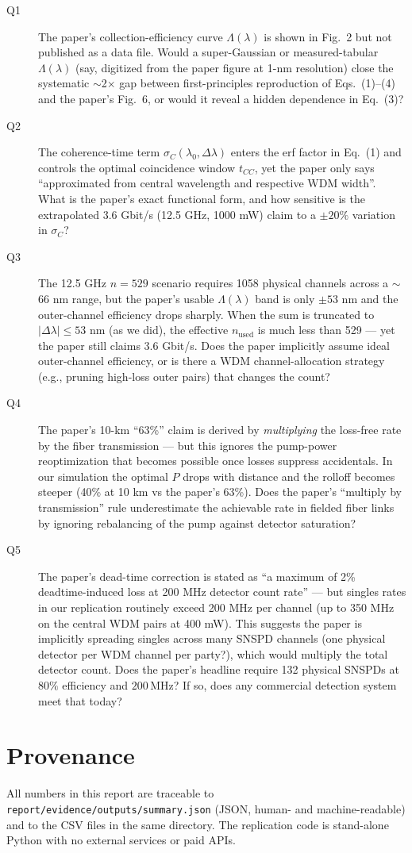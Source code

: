 \documentclass[11pt]{article}
\begin{document}
\begin{description}
\item[Q1] The paper's collection-efficiency curve $\Lambda(\lambda)$ is shown
  in Fig.~2 but not published as a data file. Would a super-Gaussian or
  measured-tabular $\Lambda(\lambda)$ (say, digitized from the paper figure at
  1-nm resolution) close the systematic $\sim$2$\times$ gap between
  first-principles reproduction of Eqs.~(1)--(4) and the paper's Fig.~6, or
  would it reveal a hidden dependence in Eq.~(3)?
\item[Q2] The coherence-time term $\sigma_C(\lambda_0,\Delta\lambda)$ enters the
  erf factor in Eq.~(1) and controls the optimal coincidence window $t_{CC}$,
  yet the paper only says ``approximated from central wavelength and respective
  WDM width''. What is the paper's exact functional form, and how sensitive is
  the extrapolated 3.6 Gbit/s (12.5 GHz, 1000 mW) claim to a $\pm 20\%$
  variation in $\sigma_C$?
\item[Q3] The 12.5 GHz $n{=}529$ scenario requires 1058 physical channels across a
  $\sim$66 nm range, but the paper's usable $\Lambda(\lambda)$ band is only
  $\pm 53$ nm and the outer-channel efficiency drops sharply.
  When the sum is truncated to $|\Delta\lambda|\leq 53$ nm (as we did), the
  effective $n_{\text{used}}$ is much less than 529 --- yet the paper still
  claims 3.6 Gbit/s. Does the paper implicitly assume ideal outer-channel
  efficiency, or is there a WDM channel-allocation strategy (e.g., pruning
  high-loss outer pairs) that changes the count?
\item[Q4] The paper's 10-km ``63\%'' claim is derived by
  \emph{multiplying} the loss-free rate by the fiber transmission --- but this
  ignores the pump-power reoptimization that becomes possible once losses
  suppress accidentals. In our simulation the optimal $P$ drops with distance
  and the rolloff becomes steeper (40\% at 10 km vs the paper's 63\%). Does
  the paper's ``multiply by transmission'' rule underestimate the achievable
  rate in fielded fiber links by ignoring rebalancing of the pump against
  detector saturation?
\item[Q5] The paper's dead-time correction is stated as ``a maximum of 2\%
  deadtime-induced loss at 200 MHz detector count rate'' --- but singles rates
  in our replication routinely exceed 200 MHz per channel (up to 350 MHz on
  the central WDM pairs at 400 mW). This suggests the paper is implicitly
  spreading singles across many SNSPD channels (one physical detector per
  WDM channel per party?), which would multiply the total detector count.
  Does the paper's headline require 132 physical SNSPDs at $80\%$ efficiency
  and $200\,\mathrm{MHz}$? If so, does any commercial detection system meet that today?
\end{description}

\section*{Provenance}
All numbers in this report are traceable to
\texttt{report/evidence/outputs/summary.json} (JSON, human- and
machine-readable) and to the CSV files in the same directory. The
replication code is stand-alone Python with no external services or
paid APIs.
\end{document}
